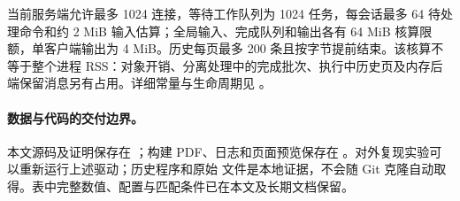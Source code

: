 当前服务端允许最多 1024 连接，等待工作队列为 1024 任务，每会话最多 64 待处理命令和约 2 MiB 输入估算；全局输入、完成队列和输出各有 64 MiB 核算限额，单客户端输出为 4 MiB。历史每页最多 200 条且按字节提前结束。该核算不等于整个进程 RSS：对象开销、分离处理中的完成批次、执行中历史页及内存后端保留消息另有占用。详细常量与生命周期见 。

\paragraph{数据与代码的交付边界。}
本文源码及证明保存在 ；构建 PDF、日志和页面预览保存在 。对外复现实验可以重新运行上述驱动；历史程序和原始  文件是本地证据，不会随 Git 克隆自动取得。表中完整数值、配置与匹配条件已在本文及长期文档保留。
